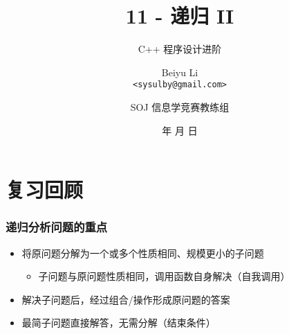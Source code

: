 \title[11 - 递归 II]
{11 - 递归 II}

\subtitle{C++ 程序设计进阶}

\author[Beiyu Li]
{Beiyu Li\\
\texttt{<sysulby@gmail.com>}}


\date[\today]
{\number\year 年 \number\month 月 \number\day 日}




\author[sysulby]
{SOJ 信息学竞赛教练组}

\begin{frame}
    \titlepage
\end{frame}
\setcounter{framenumber}{0} %


\section{复习回顾}

\begin{frame}[fragile]
    \frametitle{递归分析问题的重点}

    \begin{itemize}
        \item 将原问题分解为一个或多个性质相同、规模更小的子问题
        \begin{itemize}
            \item 子问题与原问题性质相同，调用函数自身解决（自我调用）
        \end{itemize}
        \item 解决子问题后，经过组合/操作形成原问题的答案
        \item 最简子问题直接解答，无需分解（结束条件）
    \end{itemize}
    
\end{frame}

